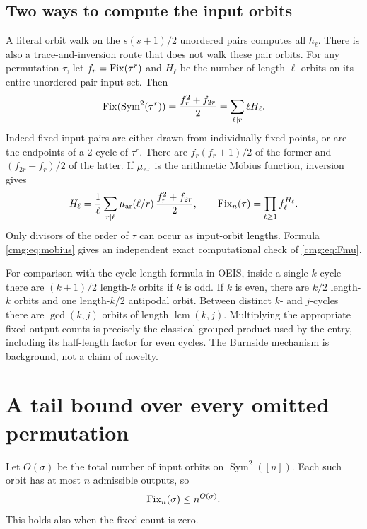 \documentclass[11pt,letterpaper]{article}
\numberwithin{equation}{section}
\theoremstyle{definition}\newtheorem{definition}[theorem]{Definition}
\theoremstyle{remark}\newtheorem{remark}[theorem]{Remark}
\newcommand{\Sym}{\operatorname{Sym}}\newcommand{\ee}{\mathrm e}
\begin{document}
\subsection{Two ways to compute the input orbits}
A literal orbit walk on the $s(s+1)/2$ unordered pairs computes all $h_\ell$. There is also a trace-and-inversion route that does not walk these pair orbits. For any permutation $\tau$, let $f_r=\operatorname{Fix}(\tau^r)$ and $H_\ell$ be the number of length-$\ell$ orbits on its entire unordered-pair input set. Then
\begin{equation}\label{cmg:eq:trace}
 \Fix(\Sym^2(\tau^r))=\frac{f_r^2+f_{2r}}2
   =\sum_{\ell\mid r}\ell H_\ell.
\end{equation}
Indeed fixed input pairs are either drawn from individually fixed points, or are the endpoints of a $2$-cycle of $\tau^r$. There are $f_r(f_r+1)/2$ of the former and $(f_{2r}-f_r)/2$ of the latter. If $\mu_{\rm ar}$ is the arithmetic M\"obius function, inversion gives
\begin{equation}\label{cmg:eq:mobius}
 H_\ell=\frac1\ell\sum_{r\mid\ell}\mu_{\rm ar}(\ell/r)\,
 \frac{f_r^2+f_{2r}}2,\qquad
 \operatorname{Fix}_n(\tau)=\prod_{\ell\ge1}f_\ell^{H_\ell}.
\end{equation}
Only divisors of the order of $\tau$ can occur as input-orbit lengths. Formula \eqref{cmg:eq:mobius} gives an independent exact computational check of \eqref{cmg:eq:Fmu}.

For comparison with the cycle-length formula in OEIS, inside a single $k$-cycle there are $(k+1)/2$ length-$k$ orbits if $k$ is odd. If $k$ is even, there are $k/2$ length-$k$ orbits and one length-$k/2$ antipodal orbit. Between distinct $k$- and $j$-cycles there are $\gcd(k,j)$ orbits of length $\operatorname{lcm}(k,j)$. Multiplying the appropriate fixed-output counts is precisely the classical grouped product used by the entry, including its half-length factor for even cycles. The Burnside mechanism is background, not a claim of novelty.

\section{A tail bound over every omitted permutation}\label{cmg:sec:tail}
Let $O(\sigma)$ be the total number of input orbits on $\Sym^2([n])$. Each such orbit has at most $n$ admissible outputs, so
\begin{equation}\label{cmg:eq:orbit-bound}
 \operatorname{Fix}_n(\sigma)\le n^{O(\sigma)}.
\end{equation}
This holds also when the fixed count is zero.
\end{document}
